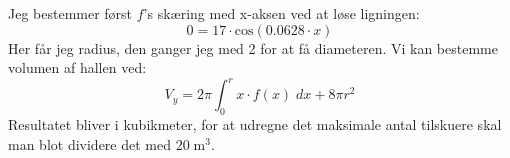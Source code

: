 \begin{tcolorbox}[title=Opgave 5,
    colback=blue!1!white,
    colframe=black,
    colbacktitle=blue!25!white,
    coltitle=red!25!black,
    fonttitle=\bfseries,
    subtitle style={boxrule=0.4pt,
    colback=blue!7!white} ]
        Jeg bestemmer først \(f\)'s skæring med x-aksen ved at løse ligningen:
        \[0=17\cdot \text{cos}(0.0628\cdot x)\]
        Her får jeg radius, den ganger jeg med 2 for at få diameteren.
        Vi kan bestemme volumen af hallen ved:
        \[V_y = 2 \pi \int _0 ^r x\cdot f(x) \; dx + 8\pi r^2\]
        Resultatet bliver i kubikmeter, for at udregne det maksimale antal tilskuere skal man blot dividere det med \(20\; \text{m}^3\).
\end{tcolorbox}